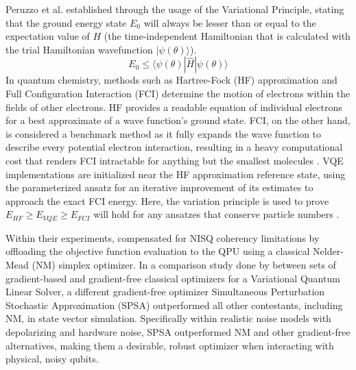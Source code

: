 Peruzzo et al. established through the usage of the Variational Principle, stating that the ground energy state $E_0$ 
will always be lesser than or equal to the expectation value of $H$ (the time-independent Hamiltonian that is calculated 
with the trial Hamiltonian wavefunction $|\psi(\theta)\rangle$). 
\begin{equation}
     E_0 \leq \langle \psi(\theta) | \hat{H} | \psi(\theta) \rangle
    \label{eq:variational_principle}
\end{equation}
In quantum chemistry, methods such as Hartree-Fock (HF) approximation and Full Configuration Interaction (FCI) determine the motion of electrons within the fields of other electrons. HF provides a 
readable equation of individual electrons for a best approximate of a wave function's ground state. FCI, on the other hand, is considered a benchmark method as it 
fully expands the wave function to describe every potential electron interaction, resulting in a  
heavy computational cost that renders FCI intractable for anything but the smallest molecules \parencite{szabo1996modernquantumchemistry}. 
VQE implementations are initialized near the HF approximation reference state, using the parameterized ansatz for an iterative improvement of its
estimates to approach the exact FCI energy. Here, the variation principle is used to prove $E_{HF} \geq E_{VQE} \geq E_{FCI}$ 
will hold for any ansatzes that conserve particle numbers \parencite{peruzzo2014variational,szabo1996modernquantumchemistry}.  

Within their experiments, \textcite{peruzzo2014variational} compensated for NISQ coherency limitations by offloading the objective function
evaluation to the QPU using a classical Nelder-Mead (NM) simplex optimizer.
In a comparison study done by \textcite{pellow2021classicoptimizers} 
between sets of gradient-based and gradient-free classical optimizers for a Variational Quantum Linear Solver, a different gradient-free optimizer 
Simultaneous Perturbation Stochastic Approximation (SPSA) outperformed all other contestants, including NM, in state vector simulation. 
Specifically within realistic noise models with depolarizing and hardware noise, SPSA outperformed NM and other gradient-free alternatives, making them a desirable, robust optimizer when interacting with physical, noisy qubits. 


